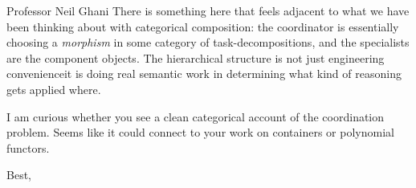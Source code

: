 \documentclass[12pt,a4paper]{letter}
\begin{document}
\begin{letter}{Professor Neil Ghani}
There is something here that feels adjacent to what we have been thinking about with categorical composition: the coordinator is essentially choosing a \emph{morphism} in some category of task-decompositions, and the specialists are the component objects. The hierarchical structure is not just engineering convenience\textemdash it is doing real semantic work in determining what kind of reasoning gets applied where.

I am curious whether you see a clean categorical account of the coordination problem. Seems like it could connect to your work on containers or polynomial functors.

\closing{Best,}

\end{letter}
\end{document}
